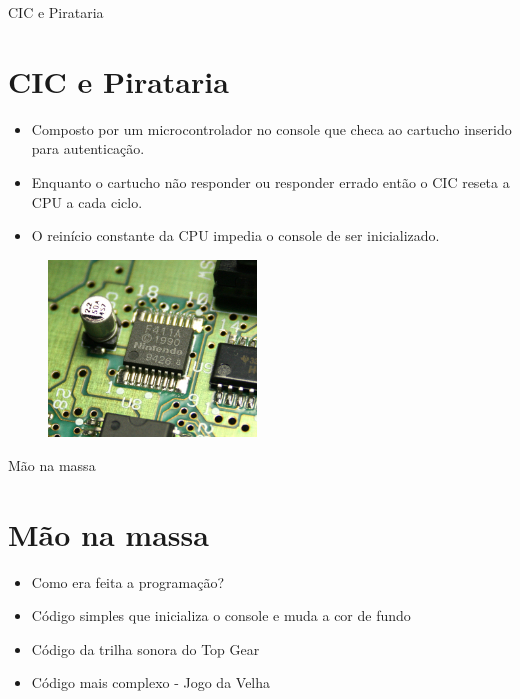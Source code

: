 \documentclass[xcolor=svgnames,handout]{beamer}
\begin{document}
\begin{frame}{CIC e Pirataria}
\section{CIC e Pirataria}
\begin{itemize}
\item Composto por um microcontrolador no console que checa ao cartucho inserido para autenticação.
\item Enquanto o cartucho não responder ou responder errado então o CIC reseta a CPU a cada ciclo.
\item O reinício constante da CPU impedia o console de ser inicializado.
\end{itemize}
\begin{figure}
  \begin{center}
    \includegraphics[height=4.7cm, width=\textwidth, keepaspectratio]{imagens/cic}
    \label{fig:}
  \end{center}
\end{figure}
\end{frame}

\begin{frame}{Mão na massa}
\section{Mão na massa}
\begin{itemize}
  \item{Como era feita a programação?}
  \item{Código simples que inicializa o console e muda a cor de fundo}
  \item{Código da trilha sonora do Top Gear}
  \item{Código mais complexo - Jogo da Velha}
\end{itemize}
\end{frame}

\end{document}
